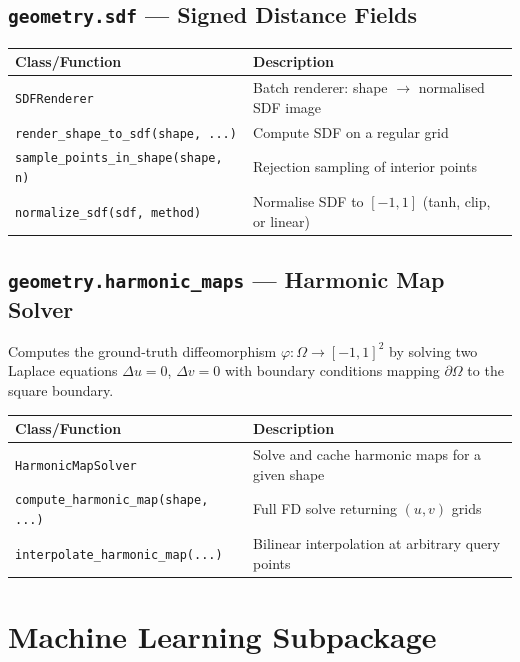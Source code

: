 \documentclass[11pt,a4paper]{report}
\begin{document}
\section{\texttt{geometry.sdf} --- Signed Distance Fields}

\begin{longtable}{lp{8cm}}
\toprule
\textbf{Class/Function} & \textbf{Description} \\
\midrule
\texttt{SDFRenderer} & Batch renderer: shape $\to$ normalised SDF image \\
\texttt{render\_shape\_to\_sdf(shape, ...)} & Compute SDF on a regular grid \\
\texttt{sample\_points\_in\_shape(shape, n)} & Rejection sampling of interior points \\
\texttt{normalize\_sdf(sdf, method)} & Normalise SDF to $[-1, 1]$ (tanh, clip, or linear) \\
\bottomrule
\end{longtable}

\section{\texttt{geometry.harmonic\_maps} --- Harmonic Map Solver}

Computes the ground-truth diffeomorphism $\varphi: \Omega \to [-1,1]^2$ by solving two Laplace equations $\Delta u = 0$, $\Delta v = 0$ with boundary conditions mapping $\partial\Omega$ to the square boundary.

\begin{longtable}{lp{8cm}}
\toprule
\textbf{Class/Function} & \textbf{Description} \\
\midrule
\texttt{HarmonicMapSolver} & Solve and cache harmonic maps for a given shape \\
\texttt{compute\_harmonic\_map(shape, ...)} & Full FD solve returning $(u, v)$ grids \\
\texttt{interpolate\_harmonic\_map(...)} & Bilinear interpolation at arbitrary query points \\
\bottomrule
\end{longtable}

\chapter{Machine Learning Subpackage}
\end{document}
